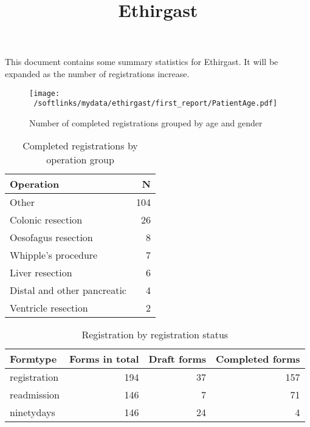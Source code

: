 \documentclass[a4paper]{article}\usepackage[]{graphicx}\usepackage[]{xcolor}
\title{Ethirgast}
\begin{document}
\maketitle

This document contains some summary statistics for Ethirgast. It will be expanded as
the number of registrations increase.




\begin{figure}[ht]
\centering
\texttt{[image: ~/softlinks/mydata/ethirgast/first\_report/PatientAge.pdf]}
\caption{Number of completed registrations grouped by age and gender}
\end{figure}

\begin{table}[ht]
\centering
\begin{tabular}{lr}
  \hline
Operation & N \\ 
  \hline
Other & 104 \\ 
  Colonic resection & 26 \\ 
  Oesofagus resection & 8 \\ 
  Whipple's procedure & 7 \\ 
  Liver resection & 6 \\ 
  Distal and other pancreatic & 4 \\ 
  Ventricle resection & 2 \\ 
   \hline
\end{tabular}
\caption{Completed registrations by operation group} 
\end{table}
\begin{table}[ht]
\centering
\begin{tabular}{lrrr}
  \hline
Formtype & Forms in total & Draft forms & Completed forms \\ 
  \hline
registration & 194 & 37 & 157 \\ 
  readmission & 146 & 7 & 71 \\ 
  ninetydays & 146 & 24 & 4 \\ 
   \hline
\end{tabular}
\caption{Registration by registration status} 
\end{table}
\end{document}
